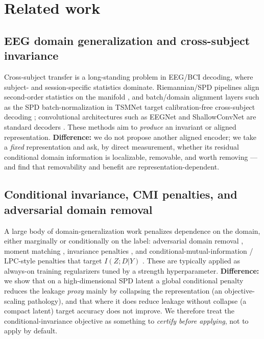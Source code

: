 \section{Related work}

\subsection{EEG domain generalization and cross-subject invariance}
Cross-subject transfer is a long-standing problem in EEG/BCI decoding, where subject- and session-specific
statistics dominate. Riemannian/SPD pipelines align second-order statistics on the manifold
\citep{barachant2012multiclass,zanini2018transfer,yger2017riemannian}, and batch/domain alignment layers such as the SPD
batch-normalization in TSMNet target calibration-free cross-subject decoding \citep{huang2017spdnet,kobler2022spd};
convolutional architectures such as EEGNet and ShallowConvNet are standard decoders
\citep{lawhern2018eegnet,schirrmeister2017deep}. These methods aim to \emph{produce} an invariant or aligned representation.
\textbf{Difference:} we do not propose another aligned encoder; we take a \emph{fixed} representation and ask, by
direct measurement, whether its residual conditional domain information is localizable, removable, and
worth removing --- and find that removability and benefit are representation-dependent.

\subsection{Conditional invariance, CMI penalties, and adversarial domain removal}
A large body of domain-generalization work penalizes dependence on the domain, either marginally or
conditionally on the label: adversarial domain removal \citep{ganin2016dann,long2018cdan}, moment matching
\citep{sun2016deepcoral,gretton2012mmd,long2015dan}, invariance penalties \citep{arjovsky2019irm,krueger2021rex}, and conditional-mutual-information /
LPC-style penalties that target $I(Z;D|Y)$ \citep{belghazi2018mine,mukherjee2020ccmi,cha2022miro}. These are typically
applied as always-on training regularizers tuned by a strength hyperparameter.
\textbf{Difference:} we show that on a high-dimensional SPD latent a global conditional penalty reduces the
leakage \emph{proxy} mainly by collapsing the representation (an objective-scaling pathology), and that where it
does reduce leakage without collapse (a compact latent) target accuracy does not improve. We therefore
treat the conditional-invariance objective as something to \emph{certify before applying}, not to apply by default.

